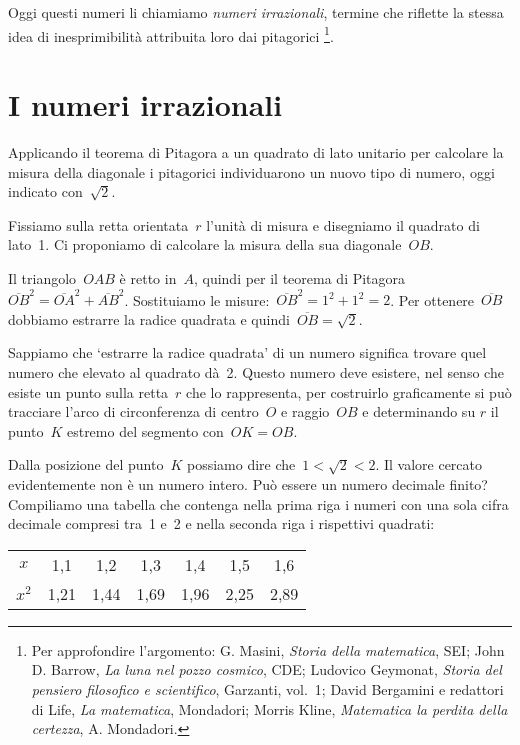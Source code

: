 Oggi questi numeri li chiamiamo \emph{numeri irrazionali}, termine che
riflette la stessa idea di inesprimibilità attribuita loro dai
pitagorici \footnote{Per approfondire l'argomento: G. Masini, \textit{Storia
della matematica}, SEI; John D. Barrow, \textit{La luna nel pozzo
cosmico}, CDE; Ludovico Geymonat, \textit{Storia del pensiero
filosofico e scientifico}, Garzanti, vol.~1; David Bergamini e redattori
di Life, \textit{La matematica}, Mondadori; Morris Kline,
\textit{Matematica la perdita della certezza}, A. Mondadori.}.

\section{I numeri irrazionali}
Applicando il teorema di Pitagora a un quadrato di lato unitario per
calcolare la misura della diagonale i pitagorici individuarono un nuovo
tipo di numero, oggi indicato con~$\sqrt{2}$.

Fissiamo sulla retta orientata~$r$ l'unità di misura e disegniamo il quadrato 
di lato~1. Ci proponiamo di calcolare la misura della sua diagonale~$OB$.

\begin{center}
 
\end{center}

Il triangolo~$OAB$ è retto in~$A$, quindi per il teorema di
Pitagora~$\overline{OB}^{2}=\overline{OA}^{2}+\overline{AB}^{2}$.
Sostituiamo le misure:~$\overline{OB}^{2}=1^2+1^2=2$. 
Per ottenere~$\overline{OB}$
dobbiamo estrarre la radice quadrata e quindi~$\overline{OB}=\sqrt{2}$.

Sappiamo che `estrarre la radice quadrata' di un numero significa trovare 
quel numero che elevato al quadrato dà~2. Questo numero deve esistere, 
nel senso che esiste un punto sulla retta~$r$ che lo rappresenta, 
per costruirlo graficamente si può tracciare l'arco di circonferenza di 
centro~$O$ e raggio~$OB$ e determinando su $r$ il punto~$K$ estremo 
del segmento con~$OK = OB$.

Dalla posizione del punto~$K$ possiamo dire che~$1<\sqrt{2}<2$. Il
valore cercato evidentemente non è un numero intero. Può essere un
numero decimale finito? Compiliamo una tabella che contenga nella prima
riga i numeri con una sola cifra decimale compresi tra~1 e~2 e nella
seconda riga i rispettivi quadrati:

\begin{center}
\begin{tabular}{ccccccc}
\toprule
$x$ & 1,1 & 1,2 & 1,3 & 1,4 & 1,5 & 1,6\\
$x^{2}$ & 1,21 & 1,44 & 1,69 & 1,96 & 2,25 & 2,89\\
\bottomrule
\end{tabular}
\end{center}

